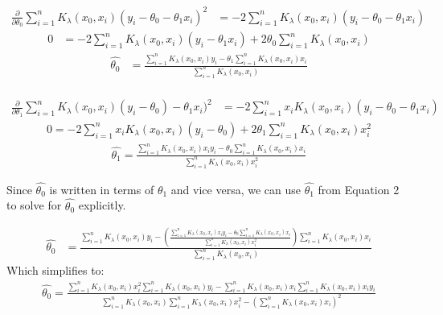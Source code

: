 \documentclass[a4paper]{article}
\begin{document}
\begin{align*}
  \frac{\partial}{\partial\theta_0} \sum\limits_{i=1}^n 
      K_\lambda(x_0,x_i)(y_i-\theta_0 - \theta_1x_i)^2 &=
  -2\sum\limits_{i=1}^n K_\lambda(x_0,x_i)(y_i-\theta_0 - \theta_1x_i)
\end{align*}
\begin{align*}
  0 &= -2\sum\limits_{i=1}^n K_\lambda(x_0,x_i)(y_i - \theta_1x_i) + 
       2\theta_0\sum\limits_{i=1}^n K_\lambda(x_0,x_i)
\end{align*}
\begin{align}
  \hat{\theta_0} &= \frac{\sum\limits_{i=1}^n K_\lambda(x_0,x_i)y_i - 
                    \theta_1\sum\limits_{i=1}^n K_\lambda(x_0,x_i)x_i}
                   {\sum\limits_{i=1}^n K_\lambda(x_0,x_i)}
\end{align}\\
  
\begin{align*}
  \frac{\partial}{\partial\theta_1} \sum\limits_{i=1}^n 
      K_\lambda(x_0,x_i)(y_i-\theta_0) - \theta_1x_i)^2 &=
  -2\sum\limits_{i=1}^n x_i K_\lambda(x_0,x_i)(y_i-\theta_0 - \theta_1x_i)
\end{align*}
\begin{align*}
  0 = -2\sum\limits_{i=1}^n x_i K_\lambda(x_0,x_i)(y_i-\theta_0) + 
      2\theta_1 \sum\limits_{i=1}^n K_\lambda(x_0,x_i) x_i^2
\end{align*}
\begin{align}
  \hat{\theta_1} = \frac{\sum\limits_{i=1}^n K_\lambda(x_0,x_i) x_i y_i -
                   \theta_0\sum\limits_{i=1}^n K_\lambda(x_0,x_i) x_i}
                  {\sum\limits_{i=1}^n K_\lambda(x_0,x_i) x_i^2}
\end{align}

Since $\hat{\theta_0}$ is written in terms of $\theta_1$ and vice versa, we
can use $\hat{\theta_1}$ from Equation 2 to solve for $\hat{\theta_0}$
explicitly.  

\begin{align*}
  \hat{\theta_0} &= \frac{\sum\limits_{i=1}^n K_\lambda(x_0,x_i)y_i - 
                    \left(
                      \frac{\sum\limits_{i=1}^n K_\lambda(x_0,x_i) x_i y_i -
                        \theta_0\sum\limits_{i=1}^n K_\lambda(x_0,x_i) x_i}
                      {\sum\limits_{i=1}^n K_\lambda(x_0,x_i) x_i^2}
                    \right)
                      \sum\limits_{i=1}^n K_\lambda(x_0,x_i)x_i}
                   {\sum\limits_{i=1}^n K_\lambda(x_0,x_i)}
\end{align*}
Which simplifies to:
\begin{align}
  \hat{\theta_0} = \frac{\sum\limits_{i=1}^n K_\lambda(x_0,x_i)x_i^2
                   \sum\limits_{i=1}^n K_\lambda(x_0,x_i) y_i - 
                   \sum\limits_{i=1}^n K_\lambda(x_0,x_i) x_i
                   \sum\limits_{i=1}^n K_\lambda(x_0,x_i) x_i y_i}
                  {\sum\limits_{i=1}^n K_\lambda(x_0,x_i)
                   \sum\limits_{i=1}^n K_\lambda(x_0,x_i) x_i^2 - 
                   \left(\sum\limits_{i=1}^n K_\lambda(x_0,x_i) x_i\right)^2}
\end{align}
\end{document}
